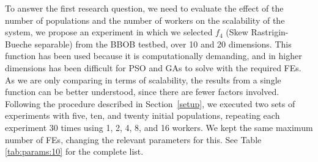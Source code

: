 \documentclass[review]{elsarticle}
\begin{document}
To answer the first research question, we need to evaluate the effect of the
number of populations and the number of workers on the scalability of the
system, we propose an experiment in which we selected $f_4$ (Skew
Rastrigin-Bueche separable) from the BBOB testbed, over 10 and 20 dimensions. This function has been used
because it is computationally demanding, and in higher dimensions has been
difficult for PSO \cite{el2009black} and GAs \cite{nicolau2009application} to
solve with the required FEs. As we are only comparing in terms of scalability,
the results from a single function can be better understood, since there are
fewer factors involved. Following the procedure described in
Section~\ref{setup}, we executed two sets of experiments with five, ten, and twenty
initial populations, repeating each experiment 30 times using 1, 2, 4, 8, and 16
workers. We kept the same maximum number of FEs, changing the relevant
parameters for this. See Table \ref{tab:params:10} for the complete list.
\end{document}
